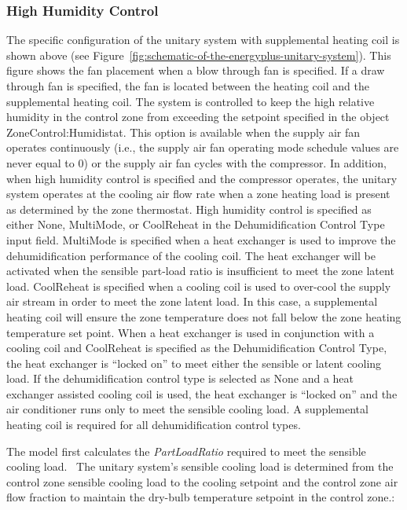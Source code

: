 \subsubsection{High Humidity Control}\label{high-humidity-control}

The specific configuration of the unitary system with supplemental heating coil is shown above (see Figure~\ref{fig:schematic-of-the-energyplus-unitary-system}). This figure shows the fan placement when a blow through fan is specified. If a draw through fan is specified, the fan is located between the heating coil and the supplemental heating coil. The system is controlled to keep the high relative humidity in the control zone from exceeding the setpoint specified in the object ZoneControl:Humidistat. This option is available when the supply air fan operates continuously (i.e., the supply air fan operating mode schedule values are never equal to 0) or the supply air fan cycles with the compressor. In addition, when high humidity control is specified and the compressor operates, the unitary system operates at the cooling air flow rate when a zone heating load is present as determined by the zone thermostat. High humidity control is specified as either None, MultiMode, or CoolReheat in the Dehumidification Control Type input field. MultiMode is specified when a heat exchanger is used to improve the dehumidification performance of the cooling coil. The heat exchanger will be activated when the sensible part-load ratio is insufficient to meet the zone latent load. CoolReheat is specified when a cooling coil is used to over-cool the supply air stream in order to meet the zone latent load. In this case, a supplemental heating coil will ensure the zone temperature does not fall below the zone heating temperature set point. When a heat exchanger is used in conjunction with a cooling coil and CoolReheat is specified as the Dehumidification Control Type, the heat exchanger is ``locked on'' to meet either the sensible or latent cooling load. If the dehumidification control type is selected as None and a heat exchanger assisted cooling coil is used, the heat exchanger is ``locked on'' and the air conditioner runs only to meet the sensible cooling load. A supplemental heating coil is required for all dehumidification control types.

The model first calculates the \emph{PartLoadRatio} required to meet the sensible cooling load.~ The unitary system's sensible cooling load is determined from the control zone sensible cooling load to the cooling setpoint and the control zone air flow fraction to maintain the dry-bulb temperature setpoint in the control zone.:

